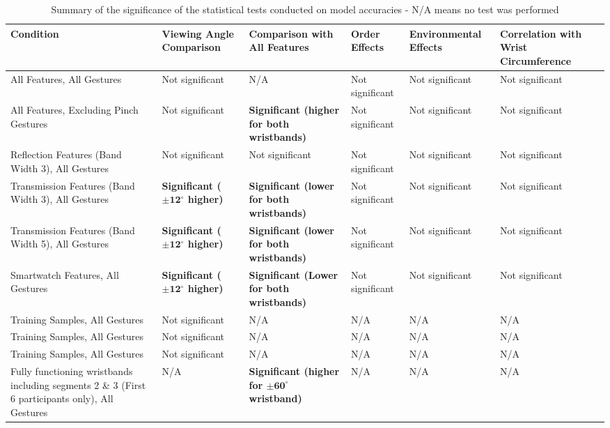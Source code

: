 \documentclass[ oneside,%
                    author={Jack Jarvis},
                    degree={BSc},
                     title={FlexIR: Flexible PCB Wristbands for Infrared Based Gesture Recognition},
                    unit={COMS30045},
                    subtitle={Investigating the Effect of LED Viewing Angle on Gesture Classification in Infrared Sensing Systems}]{dissertation}
\begin{document}
\begin{table}[htp]
    \centering
    \small
    \renewcommand{\arraystretch}{1.5} 
    \begin{tabularx}{\textwidth}{
        |>{\raggedright\arraybackslash}X|
        >{\raggedright\arraybackslash}X|
        >{\raggedright\arraybackslash}X|
        >{\raggedright\arraybackslash}X|
        >{\raggedright\arraybackslash}X|
        >{\raggedright\arraybackslash}X|
    }
        \hline
         \textbf{Condition} & \textbf{Viewing Angle Comparison} & \textbf{Comparison with All Features} & \textbf{Order Effects} & \textbf{Environmental Effects} & \textbf{Correlation with Wrist Circumference} \\
         \hline
         All Features, All Gestures & Not significant & N/A & Not significant & Not significant & Not significant \\
         \hline
         All Features, Excluding Pinch Gestures & Not significant & \textbf{Significant (higher for both wristbands)} & Not significant & Not significant & Not significant \\
         \hline
         Reflection Features (Band Width 3), All Gestures & Not significant & Not significant & Not significant & Not significant & Not significant \\
         \hline
         Transmission Features (Band Width 3), All Gestures & \textbf{Significant ($\bm{\pm 12^\circ}$ higher)} & \textbf{Significant (lower for both wristbands)} & Not significant & Not significant & Not significant \\
         \hline
         Transmission Features (Band Width 5), All Gestures & \textbf{Significant ($\bm{\pm 12^\circ}$ higher)} & \textbf{Significant (lower for both wristbands)} & Not significant & Not significant & Not significant \\
         \hline
         Smartwatch Features, All Gestures & \textbf{Significant ($\bm{\pm 12^\circ}$ higher)} & \textbf{Significant (Lower for both wristbands)} & Not significant & Not significant & Not significant \\
         \hline
         70 Training Samples, All Gestures & Not significant & N/A & N/A & N/A & N/A \\
         \hline
         140 Training Samples, All Gestures & Not significant & N/A & N/A & N/A & N/A \\
         \hline
         210 Training Samples, All Gestures & Not significant & N/A & N/A & N/A & N/A \\
         \hline
         Fully functioning wristbands including segments 2 \& 3 (First 6 participants only), All Gestures & N/A & \textbf{Significant (higher for $\bm{\pm 60^\circ}$ wristband)} & N/A & N/A & N/A \\
         \hline
    \end{tabularx}
    \caption{Summary of the significance of the statistical tests conducted on model accuracies - N/A means no test was performed}
    \label{tab:results_summary}
\end{table}
\end{document}
